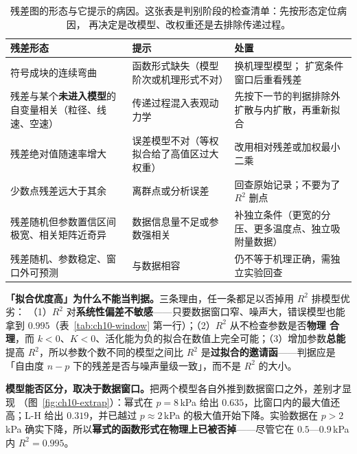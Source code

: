 \begin{table}[htbp]
\centering
\caption{残差图的形态与它提示的病因。这张表是判别阶段的检查清单：先按形态定位病因，
再决定是改模型、改权重还是去排除传递过程。
}
\label{tab:ch10-resid-diag}
\begin{tabularx}{\textwidth}{@{}l X X@{}}
\toprule
残差形态 & 提示 & 处置 \\
\midrule
符号成块的连续弯曲 & 函数形式缺失（模型阶次或机理形式不对） & 换机理型模型；
扩宽条件窗口后重看残差 \\
残差与某个\textbf{未进入模型}的自变量相关（粒径、线速、空速） &
传递过程混入表观动力学 & 先按下一节的判据排除外扩散与内扩散，再重新拟合 \\
残差绝对值随速率增大 & 误差模型不对（等权拟合给了高值区过大权重） &
改用相对残差或加权最小二乘 \\
少数点残差远大于其余 & 离群点或分析误差 & 回查原始记录；不要为了 $R^2$ 删点 \\
残差随机但参数置信区间极宽、相关矩阵近奇异 & 数据信息量不足或参数强相关 &
补独立条件（更宽的分压、更多温度点、独立吸附量数据） \\
残差随机、参数稳定、窗口外可预测 & 与数据相容 & 仍不等于机理正确，需独立实验回查 \\
\bottomrule
\end{tabularx}
\end{table}

\textbf{「拟合优度高」为什么不能当判据。}三条理由，任一条都足以否掉用 $R^2$ 排模型优劣：
（1）$R^2$ 对\textbf{系统性偏差不敏感}——只要数据窗口窄、噪声大，错误模型也能拿到
$0.995$（表~\ref{tab:ch10-window} 第一行）；（2）$R^2$ 从不检查参数是否\textbf{物理
合理}，而 $k<0$、$K<0$、活化能为负的拟合在数值上完全可能；（3）增加参数\textbf{总能}
提高 $R^2$，所以参数个数不同的模型之间比 $R^2$ 是\textbf{过拟合的邀请函}——判据应是
「自由度 $n-p$ 下的残差是否与噪声量级一致」，而不是 $R^2$ 的大小。

\textbf{模型能否区分，取决于数据窗口。}把两个模型各自外推到数据窗口之外，差别才显现
（图~\ref{fig:ch10-extrap}）：幂式在 $p=8$\,\unit{kPa} 给出 $0.635$，比窗口内的最大值还
高；L-H 给出 $0.319$，并已越过 $p\approx2$\,\unit{kPa} 的极大值开始下降。实验数据在
$p>2$\,\unit{kPa} 确实下降，所以\textbf{幂式的函数形式在物理上已被否掉}——尽管它在
$0.5$—$0.9$\,\unit{kPa} 内 $R^2=0.995$。

